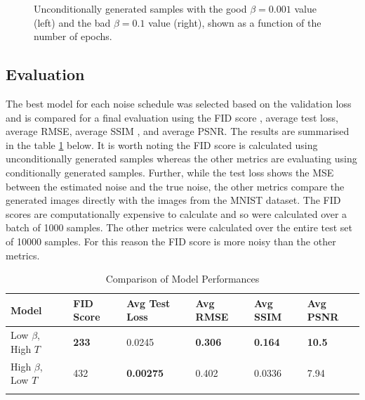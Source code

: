 \documentclass[11pt]{article}
\begin{document}
\begin{figure}[H]
\begin{minipage}{0.48\textwidth}
        \label{fig:train_uncond_right_img}
    \end{minipage}
    \caption{Unconditionally generated samples with the good $\beta=0.001$ value (left) and the bad $\beta=0.1$ value (right), shown as a function of the number of epochs.}
    \label{fig:train_unconditional_samples}
\end{figure}
\subsection{Evaluation}
The best model for each noise schedule was selected based on the validation loss and is compared for a final evaluation using the FID score \cite{Fid}, average test loss, average RMSE, average SSIM \cite{ssim}, and average PSNR. The results are summarised in the table \ref{tab:q1b_model_comparison} below. It is worth noting the FID score is calculated using unconditionally generated samples whereas the other metrics are evaluating using conditionally generated samples. Further, while the test loss shows the MSE between the estimated noise and the true noise, the other metrics compare the generated images directly with the images from the MNIST dataset. The FID scores are computationally expensive to calculate and so were calculated over a batch of 1000 samples. The other metrics were calculated over the entire test set of 10000 samples. For this reason the FID score is more noisy than the other metrics.
\begin{table}[H]
    \centering
    \caption{Comparison of Model Performances}
    \begin{tabular}{l|lllll}
    \hline
    Model          & FID Score           & Avg Test Loss        & Avg RMSE           & Avg SSIM         & Avg PSNR           \\ \hline
    Low $\beta$, High $T$ & \textbf{233}    & 0.0245              & \textbf{0.306}            & \textbf{0.164} & \textbf{10.5}    \\
    High $\beta$, Low $T$  & 432             & \textbf{0.00275}     & 0.402  & 0.0336          & 7.94              \\ \hline
    \label{tab:q1b_model_comparison}
    \end{tabular}
    \end{table}
\end{document}
